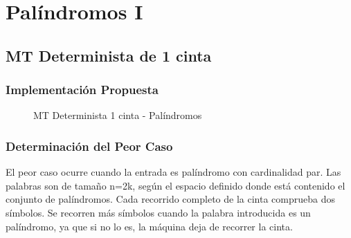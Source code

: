 \documentclass{uc3mpracticas}
\begin{document}
  \frontmatter



  \vspace{55mm}


  \newpage

  \tableofcontents

\newpage

  \mainmatter

  \section{Palíndromos I}

  \subsection{MT Determinista de 1 cinta}


  \subsubsection{Implementación Propuesta}

  \begin{figure}[!h]
    \caption{MT Determinista 1 cinta - Palíndromos}
  \end{figure}




  \subsubsection{Determinación del Peor Caso}

  El peor caso ocurre cuando la entrada es palíndromo con cardinalidad par. Las palabras son de tamaño n=2k, según el espacio definido donde está contenido el conjunto de palíndromos. Cada recorrido completo de la cinta comprueba dos símbolos. Se recorren más símbolos cuando la palabra introducida es un palíndromo, ya que si no lo es, la máquina deja de recorrer la cinta.
\end{document}
